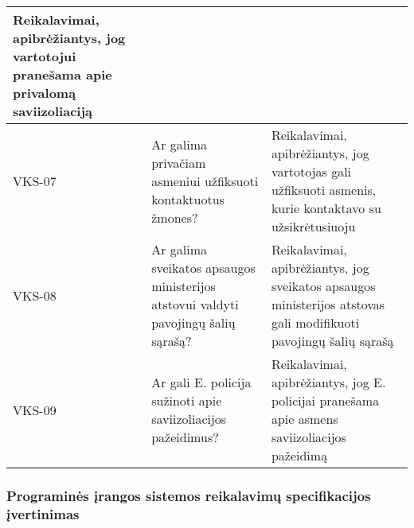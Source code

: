 \documentclass{VUMIFPSkursinis}
\begin{document}
\begin{center}
\begin{longtable}{|C{2cm}|L{5cm}|L{8cm}|}
 					Reikalavimai, apibrėžiantys, jog vartotojui pranešama apie privalomą saviizoliaciją\\ \hline   					
 					VKS-07 &
 					Ar galima privačiam asmeniui užfiksuoti kontaktuotus žmones?& 
 					Reikalavimai, apibrėžiantys, jog vartotojas gali užfiksuoti asmenis, kurie kontaktavo su užsikrėtusiuoju\\ \hline  
 					VKS-08 &
 					Ar galima sveikatos apsaugos ministerijos atstovui valdyti pavojingų šalių sąrašą?& 
 					Reikalavimai, apibrėžiantys, jog sveikatos apsaugos ministerijos atstovas gali modifikuoti pavojingų šalių sąrašą\\ \hline  
 					VKS-09 &
 					Ar gali E. policija sužinoti apie saviizoliacijos pažeidimus?& 
 					Reikalavimai, apibrėžiantys, jog E. policijai pranešama apie asmens saviizoliacijos pažeidimą\\ \hline			
				\end{longtable}
			\end{center}	


\subsubsection{Programinės įrangos sistemos reikalavimų specifikacijos įvertinimas}
\end{document}
